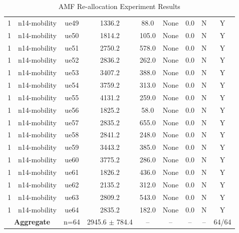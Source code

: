 \begin{table}[ht]
\begin{tabular}{|c|c|c|c|c|c|c|c|c|}
1 & n14-mobility & ue49 & 1336.2 & 88.0 & None & 0.0 & N & Y \\
1 & n14-mobility & ue50 & 1814.2 & 105.0 & None & 0.0 & N & Y \\
1 & n14-mobility & ue51 & 2750.2 & 578.0 & None & 0.0 & N & Y \\
1 & n14-mobility & ue52 & 2836.2 & 262.0 & None & 0.0 & N & Y \\
1 & n14-mobility & ue53 & 3407.2 & 388.0 & None & 0.0 & N & Y \\
1 & n14-mobility & ue54 & 3759.2 & 313.0 & None & 0.0 & N & Y \\
1 & n14-mobility & ue55 & 4131.2 & 259.0 & None & 0.0 & N & Y \\
1 & n14-mobility & ue56 & 1825.2 & 58.0 & None & 0.0 & N & Y \\
1 & n14-mobility & ue57 & 2835.2 & 655.0 & None & 0.0 & N & Y \\
1 & n14-mobility & ue58 & 2841.2 & 248.0 & None & 0.0 & N & Y \\
1 & n14-mobility & ue59 & 3443.2 & 385.0 & None & 0.0 & N & Y \\
1 & n14-mobility & ue60 & 3775.2 & 286.0 & None & 0.0 & N & Y \\
1 & n14-mobility & ue61 & 1826.2 & 436.0 & None & 0.0 & N & Y \\
1 & n14-mobility & ue62 & 2135.2 & 312.0 & None & 0.0 & N & Y \\
1 & n14-mobility & ue63 & 2809.2 & 543.0 & None & 0.0 & N & Y \\
1 & n14-mobility & ue64 & 2835.2 & 182.0 & None & 0.0 & N & Y \\
\multicolumn{2}{|c|}{\textbf{Aggregate}} & n=64 & 2945.6 $\pm$ 784.4 & -- & -- & -- & -- & 64/64 \\
\hline
\end{tabular}
\caption{AMF Re-allocation Experiment Results}
\label{tab:amf_realloc}
\end{table}
